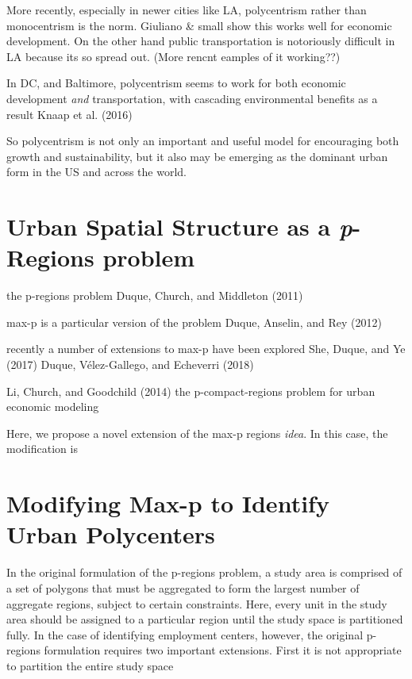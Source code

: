 \documentclass[11pt,article,oneside]{memoir}
\begin{document}
More recently, especially in newer cities like LA, polycentrism rather
than monocentrism is the norm. Giuliano \& small show this works well
for economic development. On the other hand public transportation is
notoriously difficult in LA because its so spread out. (More rencnt
eamples of it working??)

In DC, and Baltimore, polycentrism seems to work for both economic
development \emph{and} transportation, with cascading environmental
benefits as a result Knaap et al. (2016)

So polycentrism is not only an important and useful model for
encouraging both growth and sustainability, but it also may be emerging
as the dominant urban form in the US and across the world.

\hypertarget{urban-spatial-structure-as-a-p-regions-problem}{%
\section{\texorpdfstring{Urban Spatial Structure as a \emph{p}-Regions
problem}{Urban Spatial Structure as a p-Regions problem}}\label{urban-spatial-structure-as-a-p-regions-problem}}

the p-regions problem Duque, Church, and Middleton (2011)

max-p is a particular version of the problem Duque, Anselin, and Rey
(2012)

recently a number of extensions to max-p have been explored She, Duque,
and Ye (2017) Duque, Vélez-Gallego, and Echeverri (2018)

Li, Church, and Goodchild (2014) the p-compact-regions problem for urban
economic modeling

Here, we propose a novel extension of the max-p regions \emph{idea}. In
this case, the modification is

\hypertarget{modifying-max-p-to-identify-urban-polycenters}{%
\section{Modifying Max-p to Identify Urban
Polycenters}\label{modifying-max-p-to-identify-urban-polycenters}}

In the original formulation of the p-regions problem, a study area is
comprised of a set of polygons that must be aggregated to form the
largest number of aggregate regions, subject to certain constraints.
Here, every unit in the study area should be assigned to a particular
region until the study space is partitioned fully. In the case of
identifying employment centers, however, the original p-regions
formulation requires two important extensions. First it is not
appropriate to partition the entire study space
\end{document}
